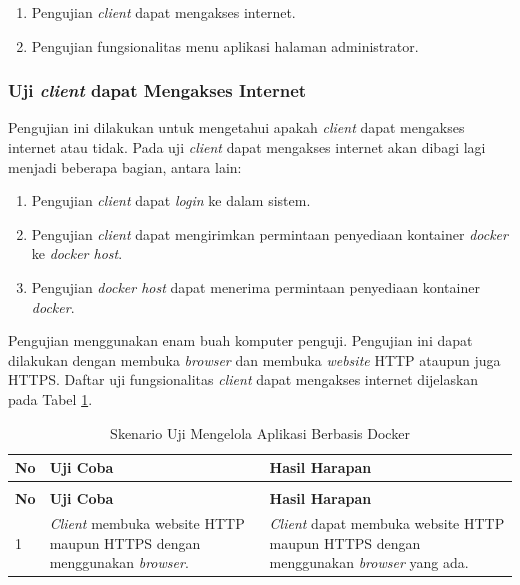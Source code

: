 \begin{enumerate}
\item Pengujian \textit{client} dapat mengakses internet.
\item Pengujian fungsionalitas menu aplikasi halaman administrator.
\end{enumerate}

\subsubsection{Uji \textit{client} dapat Mengakses Internet} \label{keempat}
Pengujian ini dilakukan untuk mengetahui apakah \textit{client} dapat mengakses internet atau tidak. Pada uji \textit{client} dapat mengakses internet akan dibagi lagi menjadi beberapa bagian, antara lain:
\begin{enumerate}
\item Pengujian \textit{client} dapat \textit{login} ke dalam sistem.
\item Pengujian \textit{client} dapat mengirimkan permintaan penyediaan kontainer \textit{docker} ke \textit{docker host}.
\item Pengujian \textit{docker host} dapat menerima permintaan penyediaan kontainer \textit{docker}.
\end{enumerate}

Pengujian menggunakan enam buah komputer penguji. Pengujian ini dapat dilakukan dengan membuka \textit{browser} dan membuka \textit{website} HTTP ataupun juga HTTPS. Daftar uji fungsionalitas \textit{client} dapat mengakses internet dijelaskan pada Tabel \ref{ujicoba4}.
\begin{longtable}{|p{}|p{}|p{}|}					\caption{Skenario Uji \textit{Client} dapat Mengakses Internet} \label{ujicoba4} \\
	\hline
	\textbf{No} & \textbf{Uji Coba} & \textbf{Hasil Harapan} \\ \hline
	\endfirsthead
	\caption[]{Skenario Uji Mengelola Aplikasi Berbasis Docker} \\
	\hline
	\textbf{No} & \textbf{Uji Coba} & \textbf{Hasil Harapan} \\ \hline
	\endhead
	\endfoot
	\endlastfoot
	
	1 & \textit{Client} membuka website HTTP maupun HTTPS dengan menggunakan \textit{browser}. & \textit{Client} dapat membuka website HTTP maupun HTTPS dengan menggunakan \textit{browser} yang ada.\\ \hline
\end{longtable}

